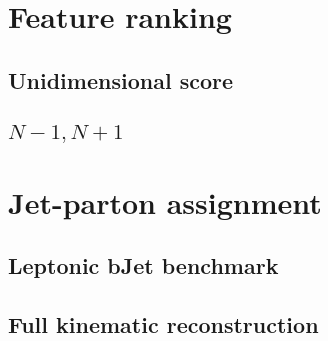 \label{sec:kin}
\vspace{-1cm}
\minitoc


\section{Feature ranking}
\subsection{Unidimensional score}
\subsection{{$N-1,N+1$}}
\section{Jet-parton assignment}
\subsection{Leptonic bJet benchmark}
\subsection{Full kinematic reconstruction}

